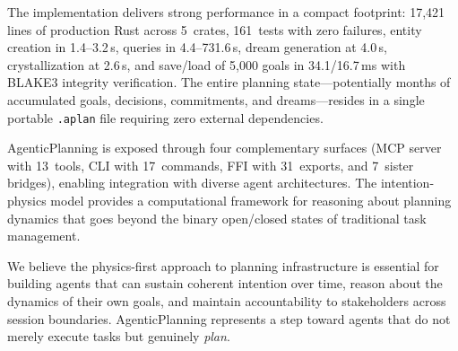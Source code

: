 \documentclass[10pt, twocolumn]{article}
\begin{document}
The implementation delivers strong performance in a compact footprint: 17{,}421 lines of production Rust across 5~crates, 161~tests with zero failures, entity creation in 1.4--3.2\,\textmu s, queries in 4.4--731.6\,\textmu s, dream generation at 4.0\,\textmu s, crystallization at 2.6\,\textmu s, and save/load of 5{,}000 goals in 34.1/16.7\,ms with BLAKE3 integrity verification. The entire planning state---potentially months of accumulated goals, decisions, commitments, and dreams---resides in a single portable \texttt{.aplan} file requiring zero external dependencies.

AgenticPlanning is exposed through four complementary surfaces (MCP server with 13~tools, CLI with 17~commands, FFI with 31~exports, and 7~sister bridges), enabling integration with diverse agent architectures. The intention-physics model provides a computational framework for reasoning about planning dynamics that goes beyond the binary open/closed states of traditional task management.

We believe the physics-first approach to planning infrastructure is essential for building agents that can sustain coherent intention over time, reason about the dynamics of their own goals, and maintain accountability to stakeholders across session boundaries. AgenticPlanning represents a step toward agents that do not merely execute tasks but genuinely \emph{plan}.



\end{document}
